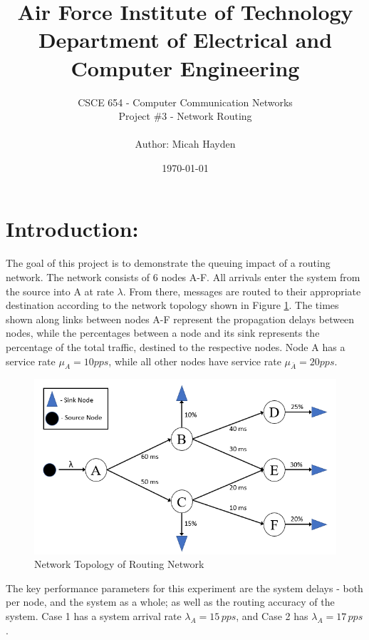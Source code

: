 \documentclass{article}
\title{Air Force Institute of Technology \\ Department of Electrical and Computer Engineering}
\author{CSCE 654 - Computer Communication Networks \\ Project \#3 - Network Routing \\ \\ Author:  Micah Hayden }
\date{\today}
\begin{document}
\maketitle

\section{Introduction:}
\label{sec:Intro}

The goal of this project is to demonstrate the queuing impact of a routing network.
The network consists of 6 nodes A-F. 
All arrivals enter the system from the source into A at rate $\lambda$.
From there, messages are routed to their appropriate destination according to the network topology shown in Figure \ref{fig:Topology}.
The times shown along links between nodes A-F represent the propagation delays between nodes, while the percentages between a node and its sink represents the percentage of the total traffic, destined to the respective nodes. 
Node A has a service rate $\mu_A = 10 pps$, while all other nodes have service rate $\mu_{\bar{A}} = 20 pps$.

\begin{figure}[h!]
\centering
\includegraphics[scale=0.75]{Images/NetworkTopology.PNG}
\caption{Network Topology of Routing Network}
\label{fig:Topology}
\end{figure}

The key performance parameters for this experiment are the system delays - both per node, and the system as a whole; as well as the routing accuracy of the system.
Case 1 has a system arrival rate $\lambda_A = 15 \, pps$, and Case 2 has $\lambda_A = 17 \, pps$.
\end{document}
